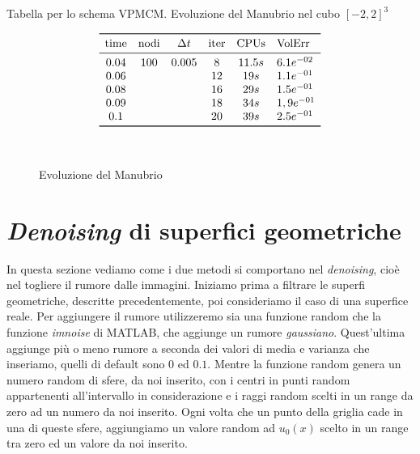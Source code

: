 \begin{table}[htb!]
\caption{Tabella per lo schema VPMCM. Evoluzione del Manubrio nel cubo $[-2,2]^3$}
\label{tab:cp4-sc1-03}
\[
\begin{array}{*{5}{c}l}
    \toprule
    \text{time} &\text{nodi} &\Delta t &\text{iter} &\text{CPUs}&\text{VolErr} \\
    \midrule
     0.04       & 100        & 0.005   & 8          & 11.5s    &6.1e^{-02}\\
     0.06       &            &         & 12         & 19s      &1.1e^{-01}\\ 
     0.08       &            &         & 16         & 29s      &1.5e^{-01}\\ 
     0.09       &            &         & 18         & 34s      &1,9e^{-01}\\
     0.1        &            &         & 20         & 39s      &2.5e^{-01}\\     
     \bottomrule
\end{array}
\]
\end{table}

\begin{figure}[htb!]
  \centering
  \quad
  \\
  \quad
  \quad
  \caption{Evoluzione del Manubrio}
  \label{fig:cp4-sc1-03}
\end{figure}

%
\section{\emph{Denoising} di superfici geometriche}

In questa sezione vediamo come i due metodi si comportano nel
\emph{denoising}, cioè nel togliere il rumore dalle immagini. Iniziamo
prima a filtrare le superfi geometriche, descritte precedentemente,
poi consideriamo il caso di una superfice reale. Per aggiungere il rumore
utilizzeremo sia una funzione random che la funzione \emph{imnoise} di
MATLAB, che aggiunge un rumore \emph{gaussiano}. Quest'ultima aggiunge
più o meno rumore a seconda dei valori di media e varianza che
inseriamo, quelli di default sono $0$ ed $0.1$. Mentre la funzione
random genera un numero random di sfere, da noi inserito, con i centri
in punti random appartenenti all'intervallo in considerazione e i
raggi random scelti in un range da zero ad un numero da noi
inserito. Ogni volta che un punto della griglia cade in una di queste
sfere, aggiungiamo un valore random ad $u_0(x)$ scelto in un range tra
zero ed un valore da noi inserito.


